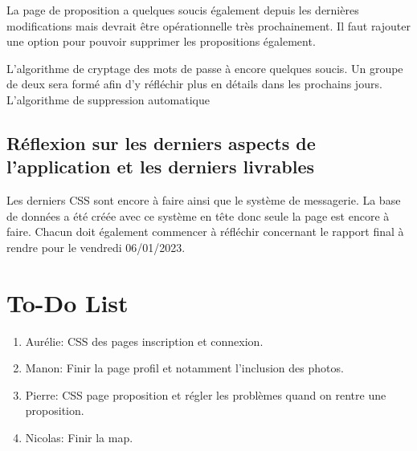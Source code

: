 \documentclass{report}
\begin{document}
La page de proposition a quelques soucis également depuis les dernières modifications mais devrait être opérationnelle très prochainement. Il faut rajouter une option pour pouvoir supprimer les propositions également.

L'algorithme de cryptage des mots de passe à encore quelques soucis. Un groupe de deux sera formé afin d'y réfléchir plus en détails dans les prochains jours. L'algorithme de suppression automatique 

\subsection{Réflexion sur les derniers aspects de l'application et les derniers livrables}

Les derniers CSS sont encore à faire ainsi que le système de messagerie. La base de données a été créée avec ce système en tête donc seule la page est encore à faire. Chacun doit également commencer à réfléchir concernant le rapport final à rendre pour le vendredi 06/01/2023.

\section{To-Do List}

\begin{enumerate}
    \item Aurélie: CSS des pages inscription et connexion.
    \item Manon: Finir la page profil et notamment l'inclusion des photos.
    \item Pierre: CSS page proposition et régler les problèmes quand on rentre une proposition.
    \item Nicolas: Finir la map.
\end{enumerate}
\end{document}
